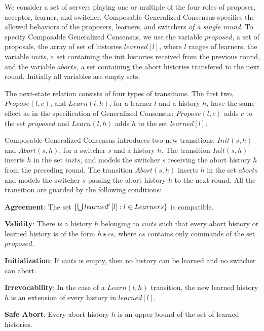 \documentclass{llncs}
\begin{document}
We consider a set of servers playing one or multiple of the four roles of proposer, acceptor, learner, and switcher. 
Composable Generalized Consensus specifies the allowed behaviors of the proposers, learners, and switchers
\emph{of a single round}. 
To specify Composable Generalized Consensus, we use the variable $proposed$, a set of proposals, the array of set of histories $learned\left[ l \right]$, where $l$ ranges of learners, the variable $inits$, a set containing the init histories received from the previous
round, and the variable $aborts$, a set containing the abort histories transfered to the next round.
Initially all variables are empty sets.

The next-state relation
consists of four types of transitions. The first two, $Propose\left( l, c \right)$, and $Learn\left( l, h \right)$, for a learner $l$ and a
history $h$, have the same effect as in the specification of Generalized Consensus: 
$Propose\left( l,c \right)$ adds $c$ to the set $proposed$ and $Learn\left( l,h \right)$ adds $h$ to the set $learned\left[ l \right]$.

Composable Generalized Consensus introduces two new transitions: $Init\left( s, h \right)$ and $Abort\left( s, h
\right)$, for a switcher $s$ and a history $h$. The transition $Init\left( s,h \right)$ inserts $h$ in the set $inits$, and models the switcher $s$ receiving
the abort history $h$ from the preceding round. The transition $Abort\left( s, h \right)$ inserts $h$ in the set $aborts$ and models the switcher $s$ passing the abort history $h$ to the next round.  
All the transition are guarded by the following conditions:
\begin{compactitem}
    \item[\textbf{Agreement}:] The set $\left\{\bigcup learned'\left[ l
      \right] : l \in Learners\right\}$ is compatible.
    \item[\textbf{Validity}:] There is a history $h$ belonging to $inits$ such that every abort history or learned history 
        is of the form $h \star cs$, where $cs$ contains only commands
        of the set $proposed$.
    \item[\textbf{Initialization}:] If $inits$ is empty, then no
        history can be learned and no switcher can abort.
    \item[\textbf{Irrevocability}:] In the case of a $Learn\left( l,h
        \right)$ transition, the new learned history $h$ is an 
        extension of every history in $learned\left[ l \right]$.
    \item[\textbf{Safe Abort}:] Every abort history $h$ is an upper bound of the set of learned histories.
\end{compactitem}
\end{document}
